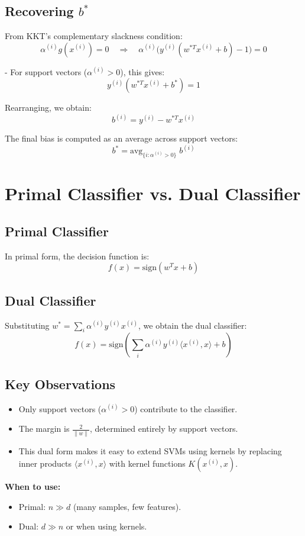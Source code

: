 \documentclass[11pt]{article}
\begin{document}
\subsection*{Recovering $b^*$}
From KKT’s complementary slackness condition:
\[
\alpha^{(i)} g(x^{(i)}) = 0
\quad \Rightarrow \quad
\alpha^{(i)} \Big( y^{(i)} (w^{*T} x^{(i)} + b) - 1 \Big) = 0
\]

- For support vectors ($\alpha^{(i)} > 0$), this gives:
\[
y^{(i)} (w^{*T} x^{(i)} + b^*) = 1
\]

Rearranging, we obtain:
\[
b^{(i)} = y^{(i)} - w^{*T} x^{(i)}
\]

The final bias is computed as an average across support vectors:
\[
b^* = \text{avg}_{\{i : \alpha^{(i)} > 0\}} \; b^{(i)}
\]

\section*{Primal Classifier vs. Dual Classifier}

\subsection*{Primal Classifier}
In primal form, the decision function is:
\[
f(x) = \text{sign}(w^T x + b)
\]

\subsection*{Dual Classifier}
Substituting $w^* = \sum_i \alpha^{(i)} y^{(i)} x^{(i)}$, we obtain the dual classifier:
\[
f(x) = \text{sign}\!\left( \sum_i \alpha^{(i)} y^{(i)} \langle x^{(i)}, x \rangle + b \right)
\]

\subsection*{Key Observations}
\begin{itemize}
    \item Only support vectors ($\alpha^{(i)} > 0$) contribute to the classifier.
    \item The margin is $\tfrac{2}{\|w\|}$, determined entirely by support vectors.
    \item This dual form makes it easy to extend SVMs using kernels by replacing inner products $\langle x^{(i)}, x \rangle$ with kernel functions $K(x^{(i)}, x)$.
\end{itemize}

\textbf{When to use:}
\begin{itemize}
    \item Primal: $n \gg d$ (many samples, few features).
    \item Dual: $d \gg n$ or when using kernels.
\end{itemize}
\end{document}
